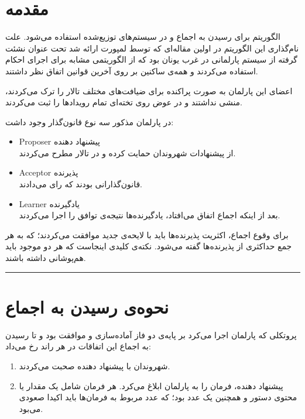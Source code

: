 \documentclass{article}
\begin{document}
\begin{multicols}{2}
\section*{مقدمه}
الگوریتم
برای رسیدن به اجماع و
در سیستم‌های توزیع‌شده استفاده می‌شود. علت نام‌گذاری این الگوریتم در اولین مقاله‌ای که توسط لمپورت ارائه شد تحت عنوان
نشئت گرفته از سیستم پارلمانی در غرب یونان
بود که از الگوریتمی مشابه برای اجرای احکام استفاده می‌کردند و همه‌ی ساکنین بر روی آخرین قوانین اتفاق نظر داشتند.

اعضای این پارلمان به صورت پراکنده برای ضیافت‌های مختلف تالار را ترک می‌کردند، منشی نداشتند و در عوض روی تخته‌ای تمام رویدادها را ثبت می‌کردند. 

در پارلمان مذکور سه نوع قانون‌گذار وجود داشت:
\begin{itemize}
    \item Proposer پیشنهاد دهنده\\
    از پیشنهادات شهروندان حمایت کرده و در تالار مطرح می‌کردند.
    \item Acceptor پذیرنده\\
    قانون‌گذارانی بودند که رای می‌دادند.
    \item Learner یادگیرنده\\
    بعد از اینکه اجماع اتفاق می‌افتاد، یادگیرنده‌ها نتیجه‌ی توافق را اجرا می‌کردند.
\end{itemize}
برای وقوع اجماع، اکثریت
پذیرنده‌ها باید با لایحه‌ی جدید موافقت می‌کردند؛ که به هر جمع حداکثری از پذیرنده‌ها
گفته می‌شود. نکته‌ی کلیدی اینجاست که هر دو
موجود باید هم‌پوشانی داشته باشند.\\
\rule{\linewidth}{1pt}

\section*{نحوه‌ی رسیدن به اجماع}
پروتکلی که پارلمان
اجرا می‌کرد بر پایه‌ی دو فاز آماده‌سازی و موافقت بود و تا رسیدن به اجماع این اتفاقات در هر راند رخ می‌داد:
\begin{enumerate}
    \item شهروندان با پیشنهاد دهنده صحبت می‌کردند.
    \item پیشنهاد دهنده، فرمان را به پارلمان ابلاغ می‌کرد. هر فرمان شامل یک مقدار یا محتوی دستور و همچنین یک عدد بود؛ که عدد مربوط به فرمان‌ها باید اکیدا صعودی می‌بود.
    

\end{enumerate}
\end{multicols}
\end{document}
